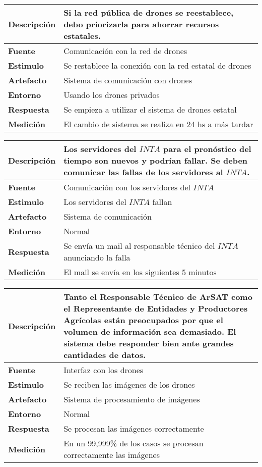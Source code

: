 \begin{tabular}{| l || p{12cm} |}
\hline 
\textbf{Descripci\'on} & Si la red pública de drones se reestablece, debo priorizarla para ahorrar recursos estatales. \\
\hline 
\textbf{Fuente} & Comunicación con la red de drones \\
\hline 
\textbf{Estimulo} & Se restablece la conexi\'on con la red estatal de drones \\
\hline 
\textbf{Artefacto} & Sistema de comunicación con drones \\
\hline 
\textbf{Entorno} & Usando los drones privados \\
\hline 
\textbf{Respuesta} & Se empieza a utilizar el sistema de drones estatal \\
\hline 
\textbf{Medici\'on} & El cambio de sistema se realiza en 24 hs a más tardar \\
\hline 
\end{tabular}

\medskip

\begin{tabular}{| l || p{12cm} |}
\hline 
\textbf{Descripci\'on} & Los servidores del $INTA$ para el pronóstico del tiempo son nuevos y podr\'ian fallar. Se deben comunicar las fallas de los servidores al $INTA$. \\
\hline 
\textbf{Fuente} & Comunicación con los servidores del $INTA$\\
\hline 
\textbf{Estimulo} & Los servidores del $INTA$ fallan\\
\hline 
\textbf{Artefacto} & Sistema de comunicación \\
\hline 
\textbf{Entorno} & Normal \\
\hline 
\textbf{Respuesta} & Se envía un mail al responsable técnico del $INTA$ anunciando la falla \\
\hline 
\textbf{Medici\'on} & El mail se envía en los siguientes 5 minutos \\
\hline 
\end{tabular}

\medskip

\begin{tabular}{| l || p{12cm} |}
\hline 
\textbf{Descripci\'on} & Tanto el Responsable T\'ecnico de ArSAT como el Representante de Entidades y Productores Agr\'icolas están preocupados por que el volumen de informaci\'on sea demasiado. El sistema debe responder bien ante grandes cantidades de datos. \\
\hline 
\textbf{Fuente} & Interfaz con los drones \\
\hline 
\textbf{Estimulo} & Se reciben las imágenes de los drones \\
\hline 
\textbf{Artefacto} & Sistema de procesamiento de imágenes \\
\hline 
\textbf{Entorno} & Normal \\
\hline 
\textbf{Respuesta} & Se procesan las imágenes correctamente \\
\hline 
\textbf{Medici\'on} & En un 99,999\% de los casos se procesan correctamente las imágenes \\
\hline 
\end{tabular}

